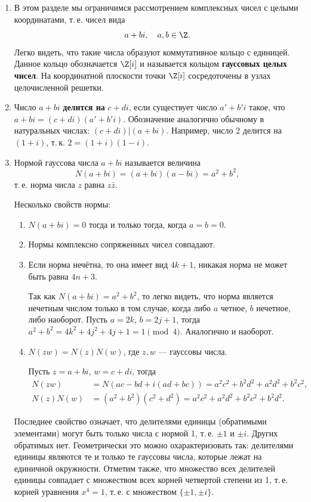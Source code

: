 \begin{enumerate}
\item В этом разделе мы ограничимся рассмотрением комплексных чисел с целыми координатами, т.\,е. чисел вида
$$
a+bi,\quad a,b\in\Z.
$$
Легко видеть, что такие числа образуют коммутативное кольцо с единицей. Данное кольцо обозначается $\Z[i]$ и называется кольцом \textbf{гауссовых целых чисел}. На координатной плоскости точки $\Z[i]$ сосредоточены в узлах целочисленной решетки.
\item Число $a+bi$ \textbf{делится на} $c+di$, если существует число $a'+b'i$ такое, что $a+bi=(c+di)(a'+b'i)$. Обозначение аналогично обычному в натуральных числах: $(c+di)|(a+bi)$. Например, число 2 делится на $(1+i)$, т.\,к. $2=(1+i)(1-i)$.

\item 
Нормой гауссова числа $a+bi$ называется величина $$N(a+bi)=(a+bi)(a-bi)=a^2+b^2,$$
т.\,е. норма числа $z$ равна $z\bar z$.

 Несколько свойств нормы:
\begin{enumerate}[{\bf Norm1}]
\item $N(a+bi)=0$ тогда и только тогда, когда $a=b=0$.
\item Нормы комплексно сопряженных чисел совпадают.
\item \label{Norm3}Если норма нечётна, то она имеет вид $4k+1$, никакая норма не может быть равна $4n+3$.

Так как $N(a+bi)=a^2+b^2$, то легко видеть, что норма является нечетным числом только в том случае, когда либо $a$ четное, $b$ нечетное, либо наоборот. Пусть $a=2k$, $b=2j+1$, тогда $a^2+b^2=4k^2+4j^2+4j+1 = 1\pmod 4$. Аналогично и наоборот.

\item $N(zw)=N(z)N(w)$, где $z,w$ --- гауссовы числа.

Пусть $z=a+bi$, $w=c+di$, тогда
\begin{align*}
N(zw)    & = N(ac-bd+i(ad+bc)) = a^2c^2+b^2d^2+a^2d^2+b^2c^2, \\
N(z)N(w) & = (a^2+b^2)(c^2+d^2) = a^2c^2+a^2d^2+b^2c^2+b^2d^2.
\end{align*}
\end{enumerate}
Последнее свойство означает, что  делителями единицы (обратимыми элементами) могут быть только числа с нормой 1, т.\,е. $\pm 1$ и $\pm i$. Других обратимых нет. Геометрически это можно охарактеризовать так: делителями единицы являются те и только те гауссовы числа, которые лежат на единичной окружности. Отметим также, что множество всех делителей единицы совпадает с множеством всех корней четвертой степени из 1, т.\,е. корней уравнения $x^4=1$, т.\,е. с множеством $\{\pm 1, \pm i\}$.


\end{enumerate}
